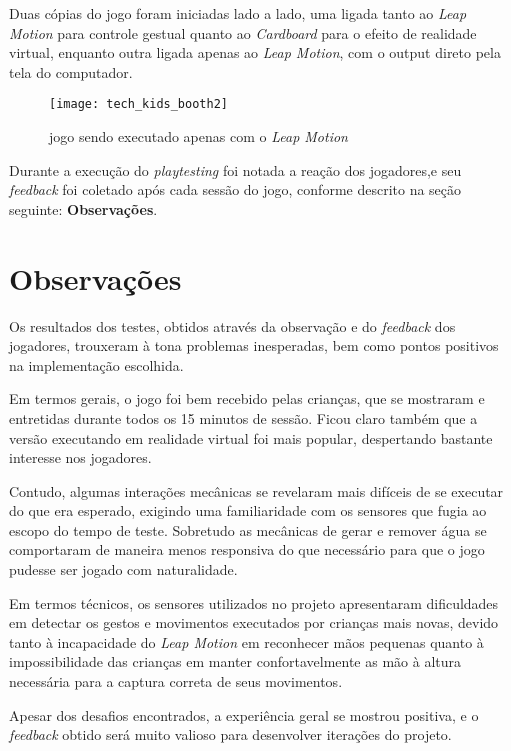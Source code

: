 Duas cópias do jogo foram iniciadas lado a lado, uma ligada tanto ao \textit{Leap Motion} para controle gestual quanto ao \textit{Cardboard} para o efeito de realidade virtual, enquanto outra ligada apenas ao \textit{Leap Motion}, com o output direto pela tela do computador.

\begin{figure}[h]
	\centering
	\texttt{[image: tech\_kids\_booth2]}
	\caption{jogo sendo executado apenas com o \textit{Leap Motion}}
\end{figure}

Durante a execução do \textit{playtesting} foi notada a reação dos jogadores,e seu \textit{feedback} foi coletado após cada sessão do jogo, conforme descrito na seção seguinte: \textbf{Observações}.

\section{Observações}

Os resultados dos testes, obtidos através da observação e do \textit{feedback} dos jogadores, trouxeram à tona problemas inesperadas, bem como pontos positivos na implementação escolhida.

Em termos gerais, o jogo foi bem recebido pelas crianças, que se mostraram e entretidas durante todos os 15 minutos de sessão. Ficou claro também que a versão executando em realidade virtual foi mais popular, despertando bastante interesse nos jogadores.

Contudo, algumas interações mecânicas se revelaram mais difíceis de se executar do que era esperado, exigindo uma familiaridade com os sensores que fugia ao escopo do tempo de teste. Sobretudo as mecânicas de gerar e remover água se comportaram de maneira menos responsiva do que necessário para que o jogo pudesse ser jogado com naturalidade.

Em termos técnicos, os sensores utilizados no projeto apresentaram dificuldades em detectar os gestos e movimentos executados por crianças mais novas, devido tanto à incapacidade do \textit{Leap Motion} em reconhecer mãos pequenas quanto à impossibilidade das crianças em manter confortavelmente as mão à altura necessária para a captura correta de seus movimentos.

Apesar dos desafios encontrados, a experiência geral se mostrou positiva, e o \textit{feedback} obtido será muito valioso para desenvolver iterações do projeto.